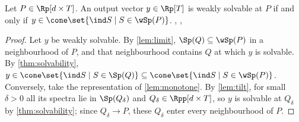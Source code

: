 \begin{theorem}\label{thm:closure}
Let $P\in\Rp[d\times T]$. An output vector $y\in\Rp[T]$ is weakly solvable at $P$ if and only if $y\in\cone\set{\ind S\mid S\in\wSp(P)}$. \hfill{}, , 
\end{theorem}

\begin{proof}
Let $y$ be weakly solvable. By \cref{lem:limit}, $\Sp(Q)\subseteq\wSp(P)$ in a neighbourhood of $P$, and that neighbourhood contains $Q$ at which $y$ is solvable. By \cref{thm:solvability}, $y\in\cone\set{\ind S\mid S\in\Sp(Q)}\subseteq\cone\set{\ind S\mid S\in\wSp(P)}$. Conversely, take the representation of \cref{lem:monotone}. By \cref{lem:tilt}, for small $\delta>0$ all its spectra lie in $\Sp(Q_\delta)$ and $Q_\delta\in\Rpp[d\times T]$, so $y$ is solvable at $Q_\delta$ by \cref{thm:solvability}; since $Q_\delta\to P$, these $Q_\delta$ enter every neighbourhood of $P$.
\end{proof}
